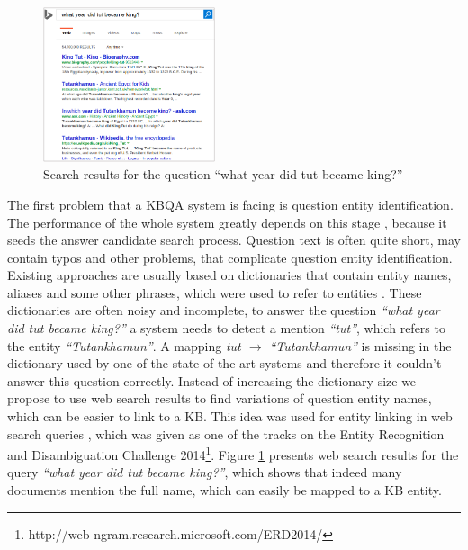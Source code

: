 \begin{figure}
\centering
\includegraphics[width=0.45\textwidth]{img/web_search_entitylink}
\caption{Search results for the question ``what year did tut became king?''}
\label{fig:web_search_entitylink}
\end{figure}

The first problem that a KBQA system is facing is question entity identification.
The performance of the whole system greatly depends on this stage \cite{yao-scratch-qa-naacl2015}, because it seeds the answer candidate search process.
Question text is often quite short, may contain typos and other problems, that complicate question entity identification.
Existing approaches are usually based on dictionaries that contain entity names, aliases and some other phrases, which were used to refer to entities \cite{SPITKOVSKY12.266}.
These dictionaries are often noisy and incomplete, \eg to answer the question \textit{``what year did tut became king?''} a system needs to detect a mention \textit{``tut''}, which refers to the entity \textit{``Tutankhamun''}.
A mapping \textit{tut $\rightarrow$ ``Tutankhamun''} is missing in the dictionary used by one of the state of the art systems and therefore it couldn't answer this question correctly.
Instead of increasing the dictionary size we propose to use web search results to find variations of question entity names, which can be easier to link to a KB.
This idea was used for entity linking in web search queries \cite{SMAPH_ERD:2014}, which was given as one of the tracks on the Entity Recognition and Disambiguation Challenge 2014\footnote{http://web-ngram.research.microsoft.com/ERD2014/}.
Figure \ref{fig:web_search_entitylink} presents web search results for the query \textit{``what year did tut became king?''}, which shows that indeed many documents mention the full name, which can easily be mapped to a KB entity.

